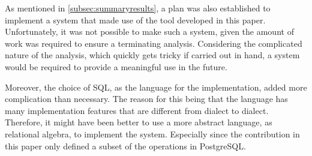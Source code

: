As mentioned in \autoref{subsec:summaryresults}, a plan was also established to implement a system that made use of the tool developed in this paper.
Unfortunately, it was not possible to make such a system, given the amount of work was required to ensure a terminating analysis.
Considering the complicated nature of the analysis, which quickly gets tricky if carried out in hand, a system would be required to provide a meaningful use in the future.


Moreover, the choice of SQL, as the language for the implementation, added more complication than necessary.
The reason for this being that the language has many implementation features that are different from dialect to dialect.
Therefore, it might have been better to use a more abstract language, as relational algebra, to implement the system.
Especially since the contribution in this paper only defined a subset of the operations in PostgreSQL.